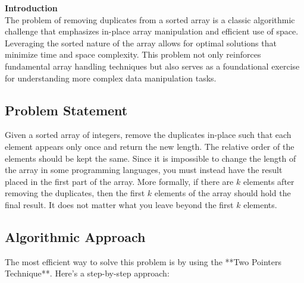 
\label{sec:remove-duplicates-from-sorted-array}

\textbf{Introduction} \\
The problem of removing duplicates from a sorted array is a classic algorithmic challenge that emphasizes in-place array manipulation and efficient use of space. Leveraging the sorted nature of the array allows for optimal solutions that minimize time and space complexity. This problem not only reinforces fundamental array handling techniques but also serves as a foundational exercise for understanding more complex data manipulation tasks.

\subsection*{Problem Statement}
Given a sorted array of integers, remove the duplicates in-place such that each element appears only once and return the new length. The relative order of the elements should be kept the same. Since it is impossible to change the length of the array in some programming languages, you must instead have the result placed in the first part of the array. More formally, if there are \(k\) elements after removing the duplicates, then the first \(k\) elements of the array should hold the final result. It does not matter what you leave beyond the first \(k\) elements.

\subsection*{Algorithmic Approach}
The most efficient way to solve this problem is by using the **Two Pointers Technique**. Here's a step-by-step approach:

